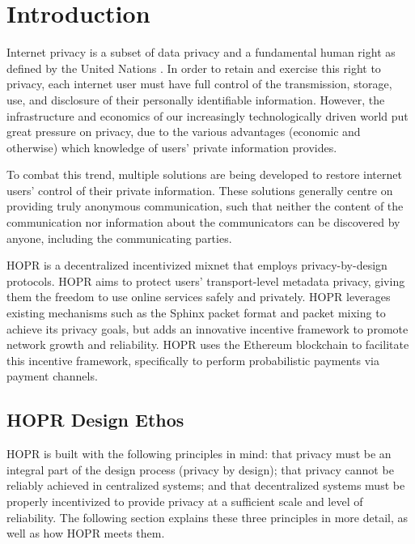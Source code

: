
\section{Introduction}
\label{sec:introduction}

Internet privacy is a subset of data privacy and a fundamental human right as defined by the United Nations \cite{un2018}. In order to retain and exercise this right to privacy, each internet user must have full control of the transmission, storage, use, and disclosure of their personally identifiable information. However, the infrastructure and economics of our increasingly technologically driven world put great pressure on privacy, due to the various advantages (economic and otherwise) which knowledge of users' private information provides.

To combat this trend, multiple solutions are being developed to restore internet users' control of their private information. These solutions generally centre on providing truly anonymous communication, such that neither the content of the communication nor information about the communicators can be discovered by anyone, including the communicating parties.

HOPR is a decentralized incentivized mixnet \cite{mixnets} that employs privacy-by-design protocols. HOPR aims to protect users' transport-level metadata privacy, giving them the freedom to use online services safely and privately. HOPR leverages existing mechanisms such as the Sphinx packet format \cite{sphinxpaper} and packet mixing to achieve its privacy goals, but adds an innovative incentive framework to promote network growth and reliability. HOPR uses the Ethereum blockchain \cite{ethereum} to facilitate this incentive framework, specifically to perform probabilistic payments via payment channels.



\subsection{HOPR Design Ethos}
\label{sec:vision}

HOPR is built with the following principles in mind: that privacy must be an integral part of the design process (privacy by design); that privacy cannot be reliably achieved in centralized systems; and that decentralized systems must be properly incentivized to provide privacy at a sufficient scale and level of reliability. The following section explains these three principles in more detail, as well as how HOPR meets them.

